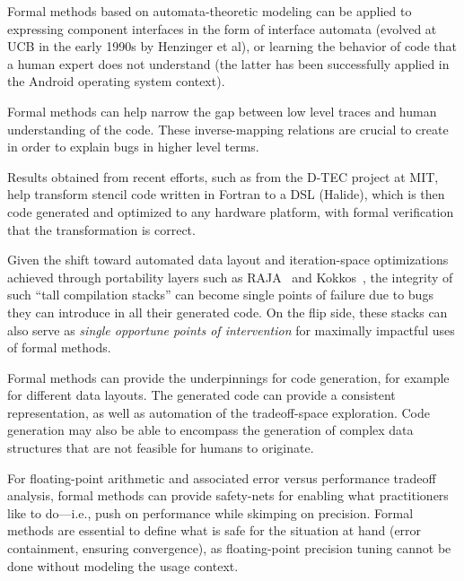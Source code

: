 Formal methods based on automata-theoretic modeling can be applied to expressing component interfaces in the form 
of interface automata (evolved at UCB in the early 1990s by
Henzinger et al), or learning the behavior of code that a human expert
does not understand (the latter has been
successfully applied in the Android 
operating system context).

Formal methods can help narrow the gap
between low level traces and human understanding
of the code. These inverse-mapping relations are 
crucial to create in order to explain bugs in higher
level terms.

Results obtained from recent efforts,
such as from the D-TEC project at MIT, help
transform stencil code written in Fortran
to a DSL (Halide), which is then code generated and optimized to any hardware platform, with formal verification that the transformation is correct.

Given the shift toward automated data layout
and iteration-space optimizations achieved through
portability layers such as 
RAJA~\cite{RAJA-LLNL-TR}
and 
Kokkos~\cite{DBLP:journals/jpdc/EdwardsTS14},
the integrity of such ``tall compilation stacks'' 
can become single points of failure
due to bugs they can introduce in
all their generated code. 
%
On the flip side, these stacks can also serve
as
{\em single opportune points of intervention}
for maximally impactful uses of formal methods.

Formal methods can provide the underpinnings
for code generation, for example
for different data layouts. The generated
code can provide a consistent representation, as well
as automation of the tradeoff-space exploration. Code
generation may also be able to encompass
the generation of complex data structures that are not feasible for humans to originate.


For floating-point arithmetic and associated error versus performance tradeoff analysis, formal methods can provide safety-nets for enabling what practitioners like to do---i.e., push
on performance while skimping on precision.
Formal methods are essential
to define what is safe for the
situation at hand (error containment, ensuring convergence), as floating-point precision tuning 
cannot be done without modeling the usage context.

